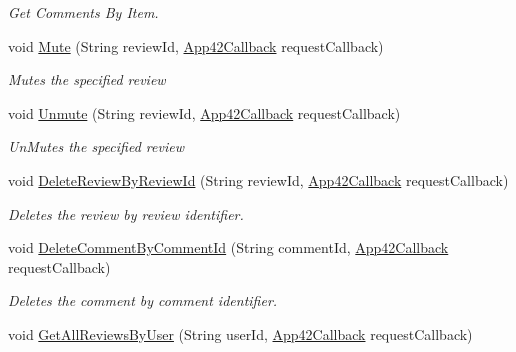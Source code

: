 \begin{DoxyCompactItemize}
\begin{DoxyCompactList}\small\item\em Get Comments By Item. \end{DoxyCompactList}\item 
void \hyperlink{classcom_1_1shephertz_1_1app42_1_1paas_1_1sdk_1_1windows_1_1review_1_1_review_service_ae89be837176320611f68f5780cdeebcf}{Mute} (String review\+Id, \hyperlink{interfacecom_1_1shephertz_1_1app42_1_1paas_1_1sdk_1_1windows_1_1_app42_callback}{App42\+Callback} request\+Callback)
\begin{DoxyCompactList}\small\item\em Mutes the specified review \end{DoxyCompactList}\item 
void \hyperlink{classcom_1_1shephertz_1_1app42_1_1paas_1_1sdk_1_1windows_1_1review_1_1_review_service_a1de2394d6cf6e5fd220c74d6e6c21517}{Unmute} (String review\+Id, \hyperlink{interfacecom_1_1shephertz_1_1app42_1_1paas_1_1sdk_1_1windows_1_1_app42_callback}{App42\+Callback} request\+Callback)
\begin{DoxyCompactList}\small\item\em Un\+Mutes the specified review \end{DoxyCompactList}\item 
void \hyperlink{classcom_1_1shephertz_1_1app42_1_1paas_1_1sdk_1_1windows_1_1review_1_1_review_service_a7e106cf49af061d46abd760384cc96b9}{Delete\+Review\+By\+Review\+Id} (String review\+Id, \hyperlink{interfacecom_1_1shephertz_1_1app42_1_1paas_1_1sdk_1_1windows_1_1_app42_callback}{App42\+Callback} request\+Callback)
\begin{DoxyCompactList}\small\item\em Deletes the review by review identifier. \end{DoxyCompactList}\item 
void \hyperlink{classcom_1_1shephertz_1_1app42_1_1paas_1_1sdk_1_1windows_1_1review_1_1_review_service_ad89e1b3b9237a31004bdcf4da96fedfc}{Delete\+Comment\+By\+Comment\+Id} (String comment\+Id, \hyperlink{interfacecom_1_1shephertz_1_1app42_1_1paas_1_1sdk_1_1windows_1_1_app42_callback}{App42\+Callback} request\+Callback)
\begin{DoxyCompactList}\small\item\em Deletes the comment by comment identifier. \end{DoxyCompactList}\item 
void \hyperlink{classcom_1_1shephertz_1_1app42_1_1paas_1_1sdk_1_1windows_1_1review_1_1_review_service_a73a98caec1f3ad301d7a6ba8a5623fcc}{Get\+All\+Reviews\+By\+User} (String user\+Id, \hyperlink{interfacecom_1_1shephertz_1_1app42_1_1paas_1_1sdk_1_1windows_1_1_app42_callback}{App42\+Callback} request\+Callback)

\end{DoxyCompactItemize}

